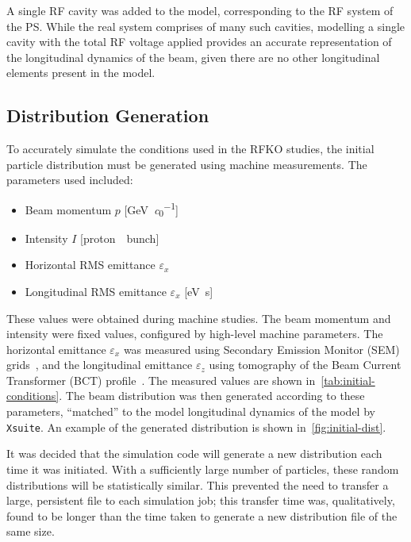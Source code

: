 \documentclass[11pt]{report}
\begin{document}
A single RF cavity was added to the model, corresponding to the RF system of the PS. While the real system comprises of many such cavities, modelling a single cavity with the total RF voltage applied provides an accurate representation of the longitudinal dynamics of the beam, given there are no other longitudinal elements present in the model.

\subsection{Distribution Generation}

To accurately simulate the conditions used in the RFKO studies, the initial particle distribution must be generated using machine measurements. The parameters used included:
\begin{itemize}
  \item Beam momentum $p$ [\si{\giga\electronvolt\per\clight}]
  \item Intensity $I$ [\si{proton \per bunch}]
  \item Horizontal RMS emittance $\varepsilon_x$
  \item Longitudinal RMS emittance $\varepsilon_x$ [\si{\electronvolt\second}]
\end{itemize}  

These values were obtained during machine studies. The beam momentum and intensity were fixed values, configured by high-level machine parameters. The horizontal emittance $\varepsilon_x$ was measured using Secondary Emission Monitor (SEM) grids~\cite{Martini:324553}, and the longitudinal emittance $\varepsilon_z$ using tomography of the Beam Current Transformer (BCT) profile~\cite{Hancock:960231}. The measured values are shown in~\autoref{tab:initial-conditions}. The beam distribution was then generated according to these parameters, ``matched'' to the model longitudinal dynamics of the model by \verb|Xsuite|. An example of the generated distribution is shown in~\autoref{fig:initial-dist}.

It was decided that the simulation code will generate a new distribution each time it was initiated. With a sufficiently large number of particles, these random distributions will be statistically similar. This prevented the need to transfer a large, persistent file to each simulation job; this transfer time was, qualitatively, found to be longer than the time taken to generate a new distribution file of the same size.
\end{document}
